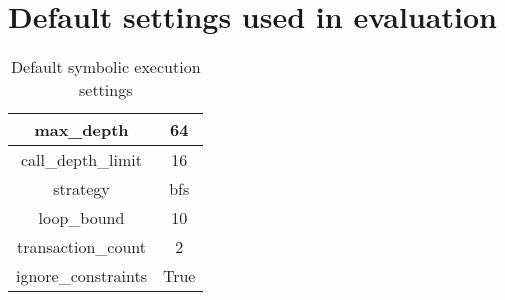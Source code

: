 \appendix


\chapter{Default settings used in evaluation}
\label{chap:appendix}

\begin{table}[h!]
  \centering
  \begin{tabular}{|| c | c||} 
   \hline
   max\_depth & 64 \\ 
   \hline
   call\_depth\_limit & 16 \\ 
   \hline
   strategy & bfs \\ 
   \hline
   loop\_bound & 10 \\ 
   \hline
   transaction\_count & 2 \\ 
   \hline
   ignore\_constraints & True \\ 
   \hline
  \end{tabular}
  \caption{Default symbolic execution settings}
  \label{table:symexec_settings}
\end{table}
